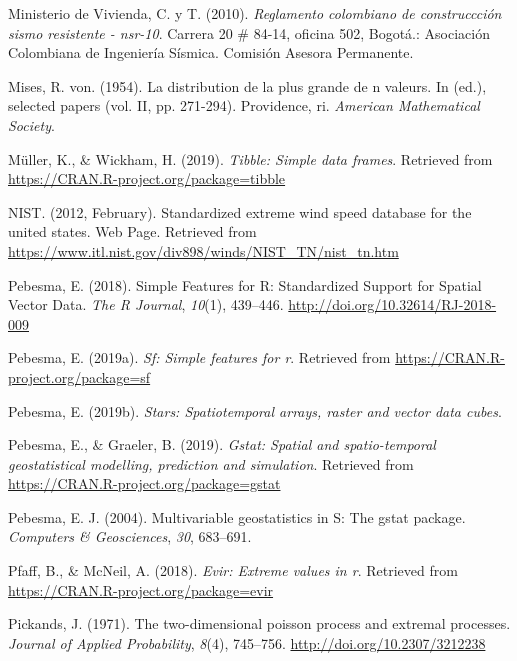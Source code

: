 \documentclass[12pt,oneside]{reedthesis}
\begin{document}
\leavevmode\hypertarget{ref-nsr10}{}%
Ministerio de Vivienda, C. y T. (2010). \emph{Reglamento colombiano de construccción sismo resistente - nsr-10}. Carrera 20 \# 84-14, oficina 502, Bogotá.: Asociación Colombiana de Ingeniería Sísmica. Comisión Asesora Permanente.

\leavevmode\hypertarget{ref-Mises1954}{}%
Mises, R. von. (1954). La distribution de la plus grande de n valeurs. In (ed.), selected papers (vol. II, pp. 271-294). Providence, ri. \emph{American Mathematical Society}.

\leavevmode\hypertarget{ref-Mueller2019}{}%
Müller, K., \& Wickham, H. (2019). \emph{Tibble: Simple data frames}. Retrieved from \url{https://CRAN.R-project.org/package=tibble}

\leavevmode\hypertarget{ref-nist2012}{}%
NIST. (2012, February). Standardized extreme wind speed database for the united states. Web Page. Retrieved from \url{https://www.itl.nist.gov/div898/winds/NIST_TN/nist_tn.htm}

\leavevmode\hypertarget{ref-Pebesma2018}{}%
Pebesma, E. (2018). Simple Features for R: Standardized Support for Spatial Vector Data. \emph{The R Journal}, \emph{10}(1), 439--446. \url{http://doi.org/10.32614/RJ-2018-009}

\leavevmode\hypertarget{ref-Pebesma2019a}{}%
Pebesma, E. (2019a). \emph{Sf: Simple features for r}. Retrieved from \url{https://CRAN.R-project.org/package=sf}

\leavevmode\hypertarget{ref-Pebesma2019b}{}%
Pebesma, E. (2019b). \emph{Stars: Spatiotemporal arrays, raster and vector data cubes}.

\leavevmode\hypertarget{ref-Pebesma2019}{}%
Pebesma, E., \& Graeler, B. (2019). \emph{Gstat: Spatial and spatio-temporal geostatistical modelling, prediction and simulation}. Retrieved from \url{https://CRAN.R-project.org/package=gstat}

\leavevmode\hypertarget{ref-Pebesma2004}{}%
Pebesma, E. J. (2004). Multivariable geostatistics in S: The gstat package. \emph{Computers \& Geosciences}, \emph{30}, 683--691.

\leavevmode\hypertarget{ref-Pfaff2018}{}%
Pfaff, B., \& McNeil, A. (2018). \emph{Evir: Extreme values in r}. Retrieved from \url{https://CRAN.R-project.org/package=evir}

\leavevmode\hypertarget{ref-Pickands1971}{}%
Pickands, J. (1971). The two-dimensional poisson process and extremal processes. \emph{Journal of Applied Probability}, \emph{8}(4), 745--756. \url{http://doi.org/10.2307/3212238}
\end{document}
